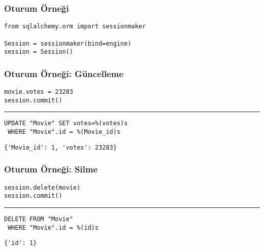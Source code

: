 \documentclass[dvipsnames]{beamer}
\theoremstyle{plain}
\begin{document}
\begin{frame}[fragile]
  \frametitle{Oturum Örneği}

  \begin{lstlisting}
from sqlalchemy.orm import sessionmaker

Session = sessionmaker(bind=engine)
session = Session()
  \end{lstlisting}
\end{frame}

%
%
%
%
%

\begin{frame}[fragile]
  \frametitle{Oturum Örneği: Güncelleme}

  \begin{lstlisting}
movie.votes = 23283
session.commit()
  \end{lstlisting}
  \hrule

  \begin{lstlisting}[language=FullSQL]
UPDATE "Movie" SET votes=%(votes)s
 WHERE "Movie".id = %(Movie_id)s
  \end{lstlisting}

  \begin{lstlisting}
{'Movie_id': 1, 'votes': 23283}
  \end{lstlisting}
\end{frame}

\begin{frame}[fragile]
  \frametitle{Oturum Örneği: Silme}

  \begin{lstlisting}
session.delete(movie)
session.commit()
  \end{lstlisting}
  \hrule

  \begin{lstlisting}[language=FullSQL]
DELETE FROM "Movie"
 WHERE "Movie".id = %(id)s
  \end{lstlisting}

  \begin{lstlisting}
{'id': 1}
  \end{lstlisting}
\end{frame}
\end{document}
